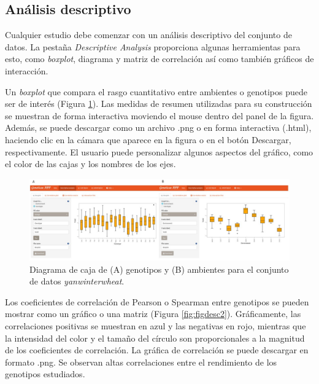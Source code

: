 \subsection{Análisis descriptivo}

Cualquier estudio debe comenzar con un análisis descriptivo del conjunto de datos. La pestaña \emph{Descriptive Analysis} proporciona algunas herramientas para esto, como  \emph{boxplot}, diagrama y matriz de correlación así como también gráficos de interacción.

Un \emph{boxplot} que compara el rasgo cuantitativo entre ambientes o genotipos puede ser de interés (Figura \ref{fig:figdesc1}). Las medidas de resumen utilizadas para su construcción se muestran de forma interactiva moviendo el mouse dentro del panel de la figura. Además, se puede descargar como un archivo .png o en forma interactiva (.html), haciendo clic en la cámara que aparece en la figura o en el botón Descargar, respectivamente. El usuario puede personalizar algunos aspectos del gráfico, como el color de las cajas y los nombres de los ejes. 

\begin{figure}[H]
	\begin{center}
		\includegraphics[width=16cm]{./Graficos/Boxplot.jpg}
	\end{center}
	\caption{Diagrama de caja de (A) genotipos y (B) ambientes para el conjunto de datos \emph{yanwinterwheat}.}
	\label{fig:figdesc1}
\end{figure}

Los coeficientes de correlación de Pearson o Spearman entre genotipos se pueden mostrar como un gráfico o una matriz (Figura \ref{fig:figdesc2}). Gráficamente, las correlaciones positivas se muestran en azul y las negativas en rojo, mientras que la intensidad del color y el tamaño del círculo son proporcionales a la magnitud de los coeficientes de correlación. La gráfica de correlación se puede descargar en formato .png. Se observan altas correlaciones entre el rendimiento de los genotipos estudiados. 

